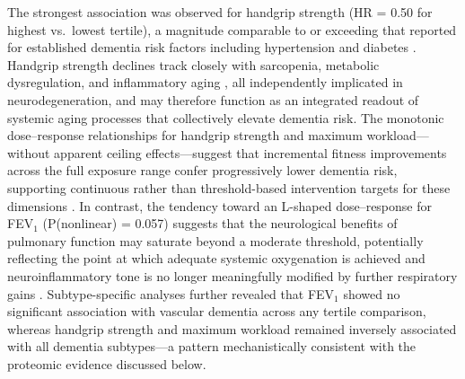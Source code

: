 \documentclass{article}
\begin{document}
The strongest association was observed for handgrip strength (HR = 0.50 for 
highest vs.\ lowest tertile), a magnitude comparable to or exceeding that 
reported for established dementia risk factors including hypertension and 
diabetes \citep{livingston2024dementia}.
Handgrip strength declines track closely with sarcopenia, metabolic 
dysregulation, and inflammatory aging \citep{cruz2019sarcopenia, 
schaap2006inflammatory}, all independently implicated in 
neurodegeneration, and may therefore function as an integrated readout 
of systemic aging processes that collectively elevate dementia risk.
The monotonic dose--response relationships for handgrip strength and maximum workload—without apparent ceiling effects—suggest that incremental 
fitness improvements across the full exposure range confer progressively 
lower dementia risk, supporting continuous rather than threshold-based 
intervention targets for these dimensions \citep{warburton2016systematic}.
In contrast, the tendency toward an L-shaped dose--response for FEV$_1$ 
(P(nonlinear) = 0.057) suggests that the neurological benefits of 
pulmonary function may saturate beyond a moderate threshold, potentially 
reflecting the point at which adequate systemic oxygenation is achieved 
and neuroinflammatory tone is no longer meaningfully modified by further 
respiratory gains \citep{portegies2016fev1}.
Subtype-specific analyses further revealed that FEV$_1$ showed no significant 
association with vascular dementia across any tertile comparison, whereas 
handgrip strength and maximum workload remained inversely associated 
with all dementia subtypes—a pattern mechanistically consistent with the 
proteomic evidence discussed below.
\end{document}
